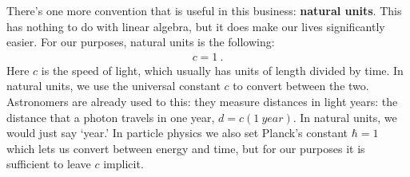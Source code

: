 \documentclass[12pt]{article}
\begin{document}
There's one more convention that is useful in this business: \textbf{natural units}. This has nothing to do with linear algebra, but it does make our lives significantly easier. For our purposes, natural units is the following:
\begin{align}
    c = 1 \ .
\end{align}
Here $c$ is the speed of light, which usually has units of length divided by time. In natural units, we use the universal constant $c$ to convert between the two. Astronomers are already used to this: they measure distances in light years: the distance that a photon travels in one year, $d = c(1~{year})$. In natural units, we would just say `year.' In particle physics we also set Planck's constant $\hbar = 1$ which lets us convert between energy and time, but for our purposes it is sufficient to leave $c$ implicit. 
\end{document}

